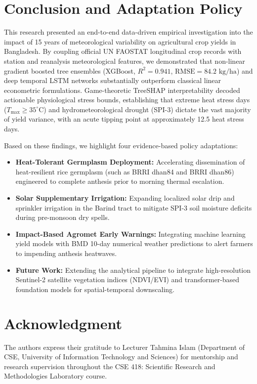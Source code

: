 \documentclass[conference]{IEEEtran}
\begin{document}
\section{Conclusion and Adaptation Policy}
This research presented an end-to-end data-driven empirical investigation into the impact of 15 years of meteorological variability on agricultural crop yields in Bangladesh. By coupling official UN FAOSTAT longitudinal crop records with station and reanalysis meteorological features, we demonstrated that non-linear gradient boosted tree ensembles (XGBoost, $R^2 = 0.941$, $\text{RMSE} = 84.2\text{ kg/ha}$) and deep temporal LSTM networks substantially outperform classical linear econometric formulations. Game-theoretic TreeSHAP interpretability decoded actionable physiological stress bounds, establishing that extreme heat stress days ($T_{\max} \ge 35^\circ\text{C}$) and hydrometeorological drought (SPI-3) dictate the vast majority of yield variance, with an acute tipping point at approximately 12.5 heat stress days.

Based on these findings, we highlight four evidence-based policy adaptations:
\begin{itemize}
    \item \textbf{Heat-Tolerant Germplasm Deployment:} Accelerating dissemination of heat-resilient rice germplasm (such as BRRI dhan84 and BRRI dhan86) engineered to complete anthesis prior to morning thermal escalation.
    \item \textbf{Solar Supplementary Irrigation:} Expanding localized solar drip and sprinkler irrigation in the Barind tract to mitigate SPI-3 soil moisture deficits during pre-monsoon dry spells.
    \item \textbf{Impact-Based Agromet Early Warnings:} Integrating machine learning yield models with BMD 10-day numerical weather predictions to alert farmers to impending anthesis heatwaves.
    \item \textbf{Future Work:} Extending the analytical pipeline to integrate high-resolution Sentinel-2 satellite vegetation indices (NDVI/EVI) and transformer-based foundation models for spatial-temporal downscaling.
\end{itemize}

\enlargethispage{2\baselineskip}
\section*{Acknowledgment}
The authors express their gratitude to Lecturer Tahmina Islam (Department of CSE, University of Information Technology and Sciences) for mentorship and research supervision throughout the CSE 418: Scientific Research and Methodologies Laboratory course.

\newpage


\end{document}
